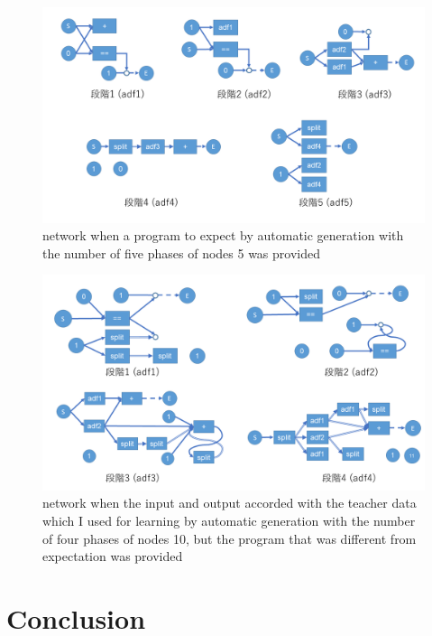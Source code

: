 \documentclass{article}
\begin{document}
\begin{figure}[t]
\begin{center}
\includegraphics[width=150mm]{out_net_p5n5.png}
\end{center}
\caption {network when a program to expect by automatic generation with the number of five phases of nodes 5 was provided}
\label{fig:out_net_p5n5}
\end{figure}
\begin{figure}[t]
\begin{center}
\includegraphics[width=150mm]{out_net_p4n10.png}
\end{center}
\caption {network when the input and output accorded with the teacher data which I used for learning by automatic generation with the number of four phases of nodes 10, but the program that was different from expectation was provided}
\label{fig:out_net_p4n10}
\end{figure}
\section {Conclusion}
\end{document}
